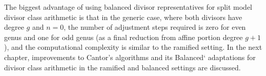 The biggest advantage of using balanced divisor representatives for split model
divisor class arithmetic is that in the generic case, where both divisors have
degree $g$ and $n=0$, the number of adjustment steps required is zero for even
genus and one for odd genus (as a final reduction from affine portion degree
$g+1$), and the computational complexity is similar to the ramified setting. In
the next chapter, improvements to Cantor's algorithms and its Balanced`
adaptations for divisor class arithmetic in the ramified and balanced settings
are discussed.


